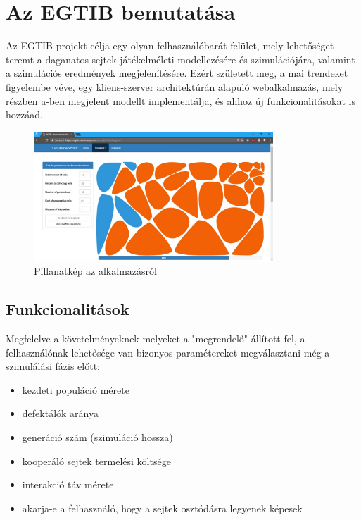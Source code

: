 \newcommand{\projectName}{Az EGTIB}

\section{\projectName{} bemutatása}

\projectName{} projekt célja egy olyan felhasználóbarát felület, mely lehetőséget teremt a daganatos sejtek játékelméleti modellezésére és szimulációjára, valamint a szimulációs eredmények megjelenítésére. Ezért született meg, a mai trendeket figyelembe véve, egy kliens-szerver architektúrán alapuló webalkalmazás, mely részben a\cite{archetti2016cooperation}-ben megjelent modellt implementálja, és ahhoz új funkcionalitásokat is hozzáad.

\begin{figure}[ht!]
	\centering
	\includegraphics[width=90mm]{images/EGTIB.jpg}
	\caption{Pillanatkép az alkalmazásról \label{fig:SimulateWithDiagram}}
\end{figure}

\subsection{Funkcionalitások}

Megfelelve a követelményeknek melyeket a "megrendelő" állított fel, a felhasználónak lehetősége van bizonyos paramétereket megválasztani még a szimulálási fázis előtt:
\begin{itemize}[noitemsep]
	\item kezdeti populáció mérete
	\item defektálók aránya 
	\item generáció szám (szimuláció hossza)
	\item kooperáló sejtek termelési költsége 
	\item interakció táv mérete
	\item akarja-e a felhasználó, hogy a sejtek osztódásra legyenek képesek
\end{itemize}

